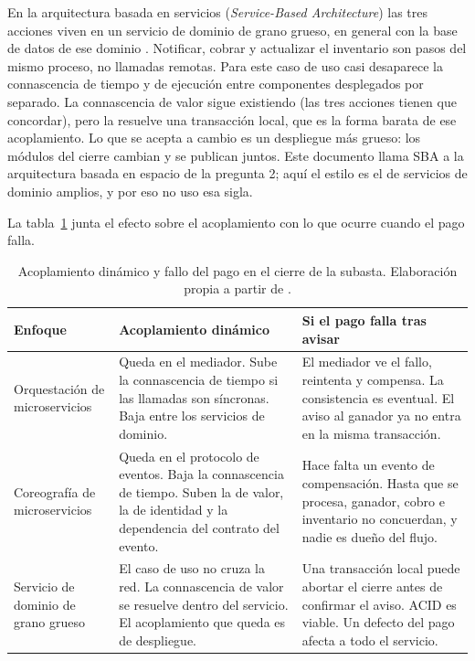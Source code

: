 En la arquitectura basada en servicios (\emph{Service-Based Architecture}) las tres acciones viven en un servicio de dominio de grano grueso, en general con la base de datos de ese dominio \parencite{richards2020fundamentals}. Notificar, cobrar y actualizar el inventario son pasos del mismo proceso, no llamadas remotas. Para este caso de uso casi desaparece la connascencia de tiempo y de ejecución entre componentes desplegados por separado. La connascencia de valor sigue existiendo (las tres acciones tienen que concordar), pero la resuelve una transacción local, que es la forma barata de ese acoplamiento. Lo que se acepta a cambio es un despliegue más grueso: los módulos del cierre cambian y se publican juntos. Este documento llama SBA a la arquitectura basada en espacio de la pregunta 2; aquí el estilo es el de servicios de dominio amplios, y por eso no uso esa sigla.

La tabla~\ref{tab:cierre-subasta} junta el efecto sobre el acoplamiento con lo que ocurre cuando el pago falla.

\begin{table}[H]
  \centering
  \footnotesize
  \renewcommand{\arraystretch}{1.25}
  \begin{tabular}{@{}p{3.1cm} p{6.1cm} p{6.1cm}@{}}
    \toprule
    \textbf{Enfoque} & \textbf{Acoplamiento dinámico} & \textbf{Si el pago falla tras avisar} \\
    \midrule
    Orquestación de microservicios &
    Queda en el mediador. Sube la connascencia de tiempo si las llamadas son síncronas. Baja entre los servicios de dominio. &
    El mediador ve el fallo, reintenta y compensa. La consistencia es eventual. El aviso al ganador ya no entra en la misma transacción. \\
    \addlinespace
    Coreografía de microservicios &
    Queda en el protocolo de eventos. Baja la connascencia de tiempo. Suben la de valor, la de identidad y la dependencia del contrato del evento. &
    Hace falta un evento de compensación. Hasta que se procesa, ganador, cobro e inventario no concuerdan, y nadie es dueño del flujo. \\
    \addlinespace
    Servicio de dominio de grano grueso &
    El caso de uso no cruza la red. La connascencia de valor se resuelve dentro del servicio. El acoplamiento que queda es de despliegue. &
    Una transacción local puede abortar el cierre antes de confirmar el aviso. ACID es viable. Un defecto del pago afecta a todo el servicio. \\
    \bottomrule
  \end{tabular}
  \caption{Acoplamiento dinámico y fallo del pago en el cierre de la subasta. Elaboración propia a partir de \parencite{richards2020fundamentals,ford2021hard}.}
  \label{tab:cierre-subasta}
\end{table}

